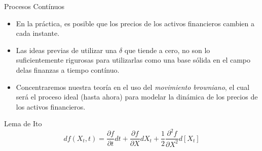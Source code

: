 \documentclass[11pt]{beamer}
\begin{document}
\begin{frame}{Procesos Contínuos}
	\begin{itemize}
		\item En la práctica, es posible que los precios de los activos financieros cambien a cada instante.
		\item Las ideas previas de utilizar una $\delta$ que tiende a cero, no son lo suficientemente rigurosas para utilizarlas como una base sólida en el campo delas finanzas a tiempo contínuo.
		\item Concentraremos nuestra teoría en el uso del \textit{movimiento browniano}, el cual será el proceso ideal (hasta ahora) para modelar la dinámica de los precios de los activos financieros.
	\end{itemize}
\end{frame}



\begin{frame}{Lema de Ito}
	\begin{equation}
	df(X_t,t)=\frac{\partial f}{ \partial t} dt+\frac{\partial f}{\partial X}dX_t+ \frac{1}{2} \frac{\partial ^{2}f}{\partial X^{2}}d \left[X_t\right]
	\end{equation}
\end{frame}
\end{document}
